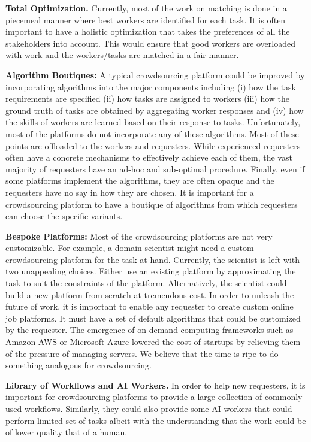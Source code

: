 \textbf{Total Optimization.}
Currently, most of the work on matching is done in a piecemeal manner
where best workers are identified for each task.
It is often important to have a holistic optimization
that takes the preferences of all the stakeholders into account.
This would ensure that good workers are overloaded with work
and the workers/tasks are matched in a fair manner. 

\textbf{Algorithm Boutiques:}
A typical crowdsourcing platform could be improved by incorporating algorithms into the major components including (i) how the task requirements are specified (ii) how tasks are assigned to workers (iii) how the ground truth of tasks are obtained by aggregating worker responses and (iv) how the skills of workers are learned based on their response to tasks.
Unfortunately, most of the platforms do not incorporate any of these algorithms.
Most of these points are offloaded to the workers and requesters.
While experienced requesters often have a concrete mechanisms to effectively achieve each of them,
the vast majority of requesters have an ad-hoc and sub-optimal procedure.
Finally, even if some platforms implement the algorithms, they are often opaque
and the requesters have no say in how they are chosen.
It is important for a crowdsourcing platform to have a boutique of algorithms
from which requesters can choose the specific variants.

\textbf{Bespoke Platforms:}
Most of the crowdsourcing platforms are not very customizable.
For example, a domain scientist might need a custom crowdsourcing platform for the task at hand.
Currently, the scientist is left with two unappealing choices.
Either use an existing platform by approximating the task to suit the constraints of the platform.
Alternatively, the scientist could build a new platform from scratch at tremendous cost.
In order to unleash the future of work, it is important to enable any requester
to create custom online job platforms.
It must have a set of default algorithms that could be customized by the requester.
The emergence of on-demand computing frameworks such as Amazon AWS or Microsoft Azure
lowered the cost of startups by relieving them of the pressure of managing servers.
We believe that the time is ripe to do something analogous for crowdsourcing.

\textbf{Library of Workflows and AI Workers.}
In order to help new requesters, it is important for crowdsourcing platforms to provide a large collection of commonly used workflows.
Similarly, they could also provide some AI workers that could perform limited set of tasks
albeit with the understanding that the work could be of lower quality that of a human.

